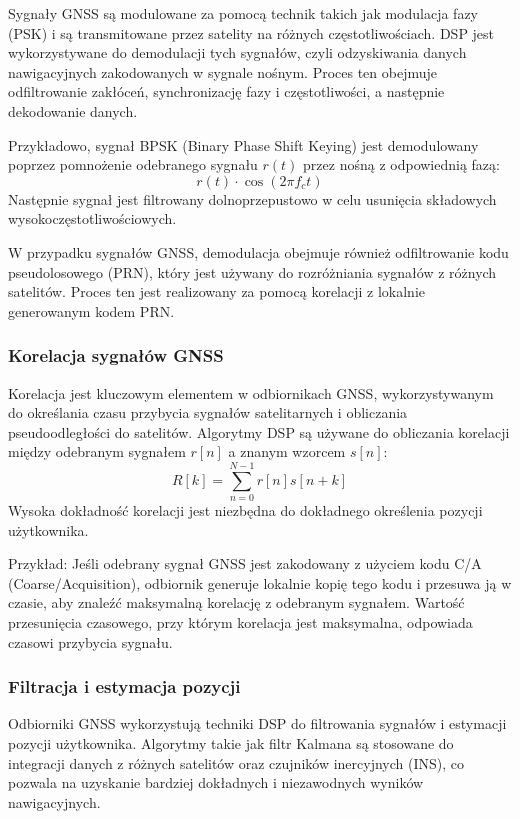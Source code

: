 Sygnały GNSS są modulowane za pomocą technik takich jak modulacja fazy (PSK) i są transmitowane przez satelity na różnych częstotliwościach. DSP jest wykorzystywane do demodulacji tych sygnałów, czyli odzyskiwania danych nawigacyjnych zakodowanych w sygnale nośnym. Proces ten obejmuje odfiltrowanie zakłóceń, synchronizację fazy i częstotliwości, a następnie dekodowanie danych.

Przykładowo, sygnał BPSK (Binary Phase Shift Keying) jest demodulowany poprzez pomnożenie odebranego sygnału $r(t)$ przez nośną z odpowiednią fazą:
\[ r(t) \cdot \cos(2\pi f_c t) \]
Następnie sygnał jest filtrowany dolnoprzepustowo w celu usunięcia składowych wysokoczęstotliwościowych.

W przypadku sygnałów GNSS, demodulacja obejmuje również odfiltrowanie kodu pseudolosowego (PRN), który jest używany do rozróżniania sygnałów z różnych satelitów. Proces ten jest realizowany za pomocą korelacji z lokalnie generowanym kodem PRN.

\subsubsection{Korelacja sygnałów GNSS}

Korelacja jest kluczowym elementem w odbiornikach GNSS, wykorzystywanym do określania czasu przybycia sygnałów satelitarnych i obliczania pseudoodległości do satelitów. Algorytmy DSP są używane do obliczania korelacji między odebranym sygnałem $r[n]$ a znanym wzorcem $s[n]$:
\[ R[k] = \sum_{n=0}^{N-1} r[n] s[n+k] \]
Wysoka dokładność korelacji jest niezbędna do dokładnego określenia pozycji użytkownika.

Przykład: Jeśli odebrany sygnał GNSS jest zakodowany z użyciem kodu C/A (Coarse/Acquisition), odbiornik generuje lokalnie kopię tego kodu i przesuwa ją w czasie, aby znaleźć maksymalną korelację z odebranym sygnałem. Wartość przesunięcia czasowego, przy którym korelacja jest maksymalna, odpowiada czasowi przybycia sygnału.

\subsubsection{Filtracja i estymacja pozycji}

Odbiorniki GNSS wykorzystują techniki DSP do filtrowania sygnałów i estymacji pozycji użytkownika. Algorytmy takie jak filtr Kalmana są stosowane do integracji danych z różnych satelitów oraz czujników inercyjnych (INS), co pozwala na uzyskanie bardziej dokładnych i niezawodnych wyników nawigacyjnych.

